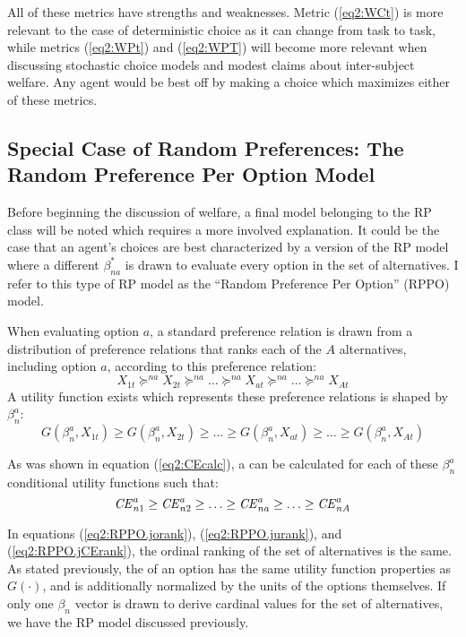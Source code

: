 \documentclass[../main.tex]{subfiles}
\begin{document}
All of these metrics have strengths and weaknesses.
Metric (\ref{eq2:WCt}) is more relevant to the case of deterministic choice as it can change from task to task, while metrics (\ref{eq2:WPt}) and (\ref{eq2:WPT}) will become more relevant when discussing stochastic choice models and modest claims about inter-subject welfare.
Any agent would be best off by making a choice which maximizes either of these metrics.

\singlespacing
\subsection{Special Case of Random Preferences: The Random Preference Per Option Model}
\doublespacing

Before beginning the discussion of welfare, a final model belonging to the RP class will be noted which requires a more involved explanation.
It could be the case that an agent's choices are best characterized by a version of the RP model where a different $\beta^*_{na}$ is drawn to evaluate every option in the set of alternatives.
I refer to this type of RP model as the \enquote{Random Preference Per Option} (RPPO) model.

When evaluating option $a$, a standard preference relation is drawn from a distribution of preference relations that ranks each of the $A$ alternatives, including option $a$, according to this preference relation:
\begin{equation}
	\label{eq2:RPPO.jorank}
	X_{1t} \succcurlyeq^{na} X_{2t} \succcurlyeq^{na} \ldots \succcurlyeq^{na} X_{at} \succcurlyeq^{na} \ldots \succcurlyeq^{na} X_{At}
\end{equation}
\noindent A utility function exists which represents these preference relations is shaped by $\beta_n^a$:
\begin{equation}
	\label{eq2:RPPO.jurank}
	G(\beta_n^a,X_{1t}) \geq G(\beta_n^a,X_{2t}) \geq \ldots \geq G(\beta_n^a,X_{at}) \geq \ldots \geq G(\beta_n^a,X_{At})
\end{equation}

As was shown in equation (\ref{eq2:CEcalc}), a {\CE} can be calculated for each of these $\beta_n^a$ conditional utility functions such that:
\begin{equation}
	\label{eq2:RPPO.jCErank}
	{\ensuremath{\mathit{CE}}}^a_{n1} \geq {\ensuremath{\mathit{CE}}}^a_{n2} \geq \ldots \geq {\ensuremath{\mathit{CE}}}^a_{na} \geq \ldots \geq {\ensuremath{\mathit{CE}}}^a_{nA}
\end{equation}

In equations (\ref{eq2:RPPO.jorank}), (\ref{eq2:RPPO.jurank}), and (\ref{eq2:RPPO.jCErank}), the ordinal ranking of the set of alternatives is the same.
As stated previously, the {\CE} of an option has the same utility function properties as $G(\cdot)$, and is additionally normalized by the units of the options themselves.
If only one $\beta_n$ vector is drawn to derive cardinal values for the set of alternatives, we have the RP model discussed previously.
\end{document}
